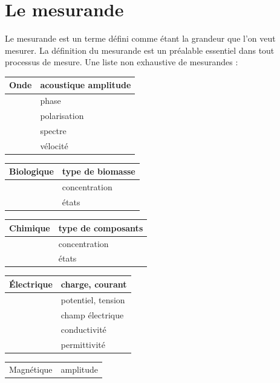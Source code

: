 \section{Le mesurande}
Le mesurande est un terme défini comme étant la grandeur que l'on veut mesurer. La définition du mesurande est un préalable essentiel dans tout processus de mesure. Une liste non exhaustive de mesurandes :

\begin {center}
\begin{tabular}{|p{3cm}|p{7cm}|}
    \hline
    Onde & acoustique	amplitude \\
    \hline
         & phase               \\
    \hline
         & polarisation        \\
    \hline
         & spectre             \\
    \hline
         & vélocité            \\
    \hline
\end{tabular}
\begin{tabular}{|p{3cm}|p{7cm}|}
    Biologique & type de biomasse \\
    \hline
               & concentration    \\
    \hline
               & états            \\
    \hline
\end{tabular}
\begin{tabular}{|p{3cm}|p{7cm}|}
    Chimique & type de composants \\
    \hline
             & concentration      \\
    \hline
             & états              \\
    \hline
\end{tabular}
\begin{tabular}{|p{3cm}|p{7cm}|}
    Électrique & charge, courant    \\
    \hline
               & potentiel, tension \\
    \hline
               & champ électrique   \\
    \hline
               & conductivité       \\
    \hline
               & permittivité       \\
    \hline
\end{tabular}
\begin{tabular}{|p{3cm}|p{7cm}|}
    Magnétique & amplitude    \\

\end{tabular}
\end{center}
